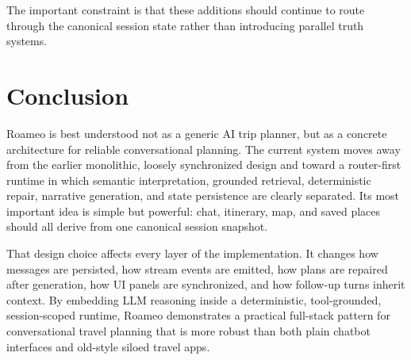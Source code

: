 \documentclass[conference]{IEEEtran}
\begin{document}
The important constraint is that these additions should continue to route through the canonical session state rather than introducing parallel truth systems.

\section{Conclusion}

Roameo is best understood not as a generic AI trip planner, but as a concrete architecture for reliable conversational planning. The current system moves away from the earlier monolithic, loosely synchronized design and toward a router-first runtime in which semantic interpretation, grounded retrieval, deterministic repair, narrative generation, and state persistence are clearly separated. Its most important idea is simple but powerful: chat, itinerary, map, and saved places should all derive from one canonical session snapshot.

That design choice affects every layer of the implementation. It changes how messages are persisted, how stream events are emitted, how plans are repaired after generation, how UI panels are synchronized, and how follow-up turns inherit context. By embedding LLM reasoning inside a deterministic, tool-grounded, session-scoped runtime, Roameo demonstrates a practical full-stack pattern for conversational travel planning that is more robust than both plain chatbot interfaces and old-style siloed travel apps.
\end{document}
